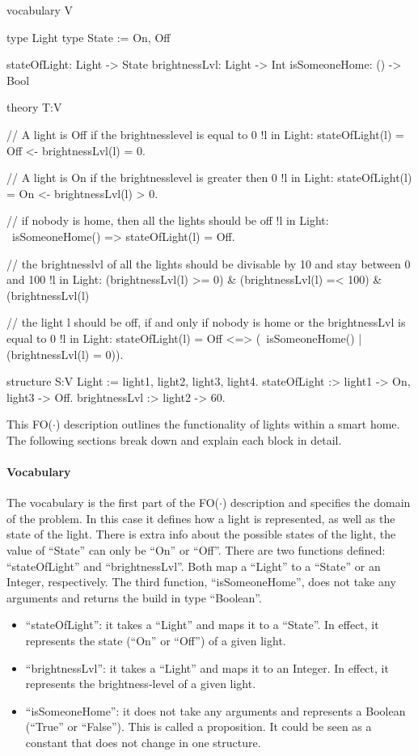 \documentclass[11pt,a4paper]{report}
\newcommand{\fodot}{FO($\cdot$)\xspace}
\begin{document}
\begin{idplisting}
vocabulary V {
    type Light
    type State := {On, Off}
    
    stateOfLight: Light -> State
    brightnessLvl: Light -> Int
    isSomeoneHome: () -> Bool
}

theory T:V {
    {
       // A light is Off if the brightnesslevel is equal to 0
       !l in Light: stateOfLight(l) = Off <- brightnessLvl(l) = 0.
       
       // A light is On if the brightnesslevel is greater then 0
       !l in Light: stateOfLight(l) = On <- brightnessLvl(l) > 0.
    }
    
    // if nobody is home, then all the lights should be off
    !l in Light: ~isSomeoneHome() => stateOfLight(l) = Off.
    
    // the brightnesslvl of all the lights should be divisable by 10 and stay between 0 and 100
    !l in Light: (brightnessLvl(l) >= 0) & (brightnessLvl(l) =< 100) & (brightnessLvl(l) %
    
    // the light l should be off, if and only if nobody is home or the brightnessLvl is equal to 0
    !l in Light: stateOfLight(l) = Off <=> (~isSomeoneHome() | (brightnessLvl(l) = 0)).
}

structure S:V {
    Light := {light1, light2, light3, light4}.
    stateOfLight :> {light1 -> On, light3 -> Off}.
    brightnessLvl :> {light2 -> 60}.
}


\end{idplisting}
This \fodot description outlines the functionality of lights within a smart home. The following sections break down and explain each block in detail.

\paragraph{Vocabulary}
The vocabulary is the first part of the \fodot description and specifies the domain of the problem. In this case it defines how a light is represented, as well as the state of the light. There is extra info about the possible states of the light, the value of ``State'' can only be ``On'' or ``Off''. There are two functions defined: ``stateOfLight'' and ``brightnessLvl''. Both map a ``Light'' to a ``State'' or an Integer, respectively. The third function, ``isSomeoneHome'', does not take any arguments and returns the build in type ``Boolean''.
\begin{itemize}
    \item ``stateOfLight'': it takes a ``Light'' and maps it to a ``State''. In effect, it represents the state (``On'' or ``Off'') of a given light.
    \item ``brightnessLvl'': it takes a ``Light'' and maps it to an Integer. In effect, it represents the brightness-level of a given light.
    \item ``isSomeoneHome'': it does not take any arguments and represents a Boolean (``True'' or ``False''). This is called a proposition. It could be seen as a constant that does not change in one structure.
\end{itemize}
\end{document}
